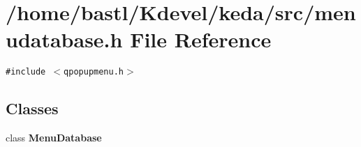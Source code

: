 \section{/home/bastl/Kdevel/keda/src/menudatabase.h File Reference}
\label{menudatabase_8h}
{\tt \#include $<$qpopupmenu.h$>$}\par
\subsection*{Classes}
\begin{CompactItemize}
\item 
class {\bf Menu\-Database}
\end{CompactItemize}
